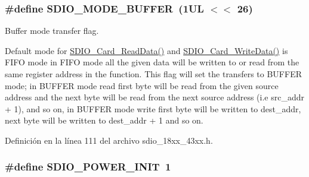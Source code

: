 \subsubsection[{\texorpdfstring{S\+D\+I\+O\+\_\+\+M\+O\+D\+E\+\_\+\+B\+U\+F\+F\+ER}{SDIO_MODE_BUFFER}}]{\setlength{\rightskip}{0pt plus 5cm}\#define S\+D\+I\+O\+\_\+\+M\+O\+D\+E\+\_\+\+B\+U\+F\+F\+ER~(1\+U\+L $<$$<$ 26)}\hypertarget{group___s_d_i_o__18_x_x__43_x_x_gacfb2f991cf5339b325520be169aa90d8}{}\label{group___s_d_i_o__18_x_x__43_x_x_gacfb2f991cf5339b325520be169aa90d8}


Buffer mode transfer flag. 

Default mode for \hyperlink{group___s_d_i_o__18_x_x__43_x_x_ga340277ee179263511434895dd79fdd81}{S\+D\+I\+O\+\_\+\+Card\+\_\+\+Read\+Data()} and \hyperlink{group___s_d_i_o__18_x_x__43_x_x_gab2b52e00bab2f72ab27fca006c48cf19}{S\+D\+I\+O\+\_\+\+Card\+\_\+\+Write\+Data()} is F\+I\+FO mode in F\+I\+FO mode all the given data will be written to or read from the same register address in the function. This flag will set the transfers to B\+U\+F\+F\+ER mode; in B\+U\+F\+F\+ER mode read first byte will be read from the given source address and the next byte will be read from the next source address (i.\+e src\+\_\+addr + 1), and so on, in B\+U\+F\+F\+ER mode write first byte will be written to dest\+\_\+addr, next byte will be written to dest\+\_\+addr + 1 and so on. 

Definición en la línea 111 del archivo sdio\+\_\+18xx\+\_\+43xx.\+h.

\subsubsection[{\texorpdfstring{S\+D\+I\+O\+\_\+\+P\+O\+W\+E\+R\+\_\+\+I\+N\+IT}{SDIO_POWER_INIT}}]{\setlength{\rightskip}{0pt plus 5cm}\#define S\+D\+I\+O\+\_\+\+P\+O\+W\+E\+R\+\_\+\+I\+N\+IT~1}\hypertarget{group___s_d_i_o__18_x_x__43_x_x_ga5a20ad7b551a63146fb59ab17418a097}{}\label{group___s_d_i_o__18_x_x__43_x_x_ga5a20ad7b551a63146fb59ab17418a097}


